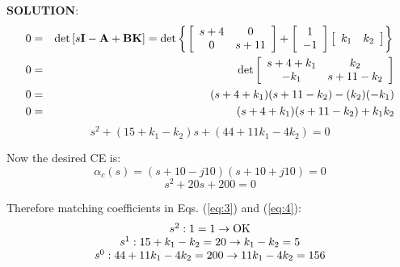 \textbf{SOLUTION}:
\begin{eqnarray*}
	0 & = & \det \left[ {s{\bf{I}} - {\bf{A}} + {\bf{BK}}} \right] = \det \left\{ {\left. {\left[ {\begin{array}{*{20}c}
	   {s + 4} & 0  \\
	   0 & {s + 11}  \\
	\end{array}} \right] + \left[ {\begin{array}{*{20}c}
	   1  \\
	   { - 1}  \\
	\end{array}} \right]\left[ {\begin{array}{*{20}c}
	   {k_1 } & {k_2 }  \\
	\end{array}} \right]} \right\}} \right. \\
	0 & = & \det \left[ {\begin{array}{*{20}c}
	   {s + 4 + k_1 } & {k_2 }  \\
	   { - k_1 } & {s + 11 - k_2 }  \\
	\end{array}} \right] \\
	0 & = & (s + 4 + k_1 )(s + 11 - k_2 ) - (k_2 )( - k_1 ) \\
	0 & = & (s+4+k_1)(s+11-k_2)+k_1k_2
\end{eqnarray*}
\begin{equation}
	\label{eq:3}
	s^2+(15+k_1-k_2)s+(44+11k_1-4k_2)=0
\end{equation}

Now the desired CE is:
\[
\alpha_c(s)=(s+10-j10)(s+10+j10) = 0
\]
\begin{equation}\label{eq:4}
	s^2+20s+200=0
\end{equation}

Therefore matching coefficients in Eqs. (\ref{eq:3}) and (\ref{eq:4}):
\[
\begin{array}{c}
 s^2 :1 = 1 \to {\rm{OK}} \\ 
 s^1 :15 + k_1  - k_2  = 20 \to k_1  - k_2  = 5 \\ 
 s^0 :44 + 11k_1  - 4k_2  = 200 \to 11k_1  - 4k_2  = 156 \\ 
 \end{array}
\]

 

